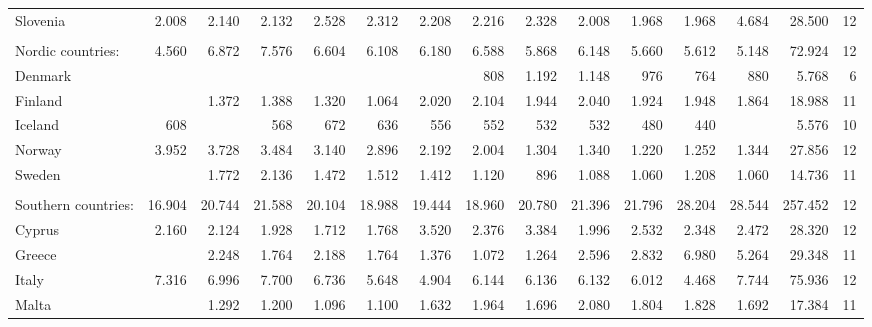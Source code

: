 \begin{tabular}{lrrrrrrrrrrrrrr}
  \hspace{5mm} Slovenia & 2.008 & 2.140 & 2.132 & 2.528 & 2.312 & 2.208 & 2.216 & 2.328 & 2.008 & 1.968 & 1.968 & 4.684 & 28.500 &  12 \\ 
  \multicolumn{14}{l}{\phantom{empty}} \\
  Nordic countries: & 4.560 & 6.872 & 7.576 & 6.604 & 6.108 & 6.180 & 6.588 & 5.868 & 6.148 & 5.660 & 5.612 & 5.148 & 72.924 &  12 \\ 
  \hspace{5mm} Denmark &  &  &  &  &  &  & 808 & 1.192 & 1.148 & 976 & 764 & 880 & 5.768 &   6 \\ 
  \hspace{5mm} Finland &  & 1.372 & 1.388 & 1.320 & 1.064 & 2.020 & 2.104 & 1.944 & 2.040 & 1.924 & 1.948 & 1.864 & 18.988 &  11 \\ 
  \hspace{5mm} Iceland & 608 &  & 568 & 672 & 636 & 556 & 552 & 532 & 532 & 480 & 440 &  & 5.576 &  10 \\ 
  \hspace{5mm} Norway & 3.952 & 3.728 & 3.484 & 3.140 & 2.896 & 2.192 & 2.004 & 1.304 & 1.340 & 1.220 & 1.252 & 1.344 & 27.856 &  12 \\ 
  \hspace{5mm} Sweden &  & 1.772 & 2.136 & 1.472 & 1.512 & 1.412 & 1.120 & 896 & 1.088 & 1.060 & 1.208 & 1.060 & 14.736 &  11 \\ 
  \multicolumn{14}{l}{\phantom{empty}} \\
  Southern countries: & 16.904 & 20.744 & 21.588 & 20.104 & 18.988 & 19.444 & 18.960 & 20.780 & 21.396 & 21.796 & 28.204 & 28.544 & 257.452 &  12 \\ 
  \hspace{5mm} Cyprus & 2.160 & 2.124 & 1.928 & 1.712 & 1.768 & 3.520 & 2.376 & 3.384 & 1.996 & 2.532 & 2.348 & 2.472 & 28.320 &  12 \\ 
  \hspace{5mm} Greece &  & 2.248 & 1.764 & 2.188 & 1.764 & 1.376 & 1.072 & 1.264 & 2.596 & 2.832 & 6.980 & 5.264 & 29.348 &  11 \\ 
  \hspace{5mm} Italy & 7.316 & 6.996 & 7.700 & 6.736 & 5.648 & 4.904 & 6.144 & 6.136 & 6.132 & 6.012 & 4.468 & 7.744 & 75.936 &  12 \\ 
  \hspace{5mm} Malta &  & 1.292 & 1.200 & 1.096 & 1.100 & 1.632 & 1.964 & 1.696 & 2.080 & 1.804 & 1.828 & 1.692 & 17.384 &  11 \\ 

\end{tabular}
